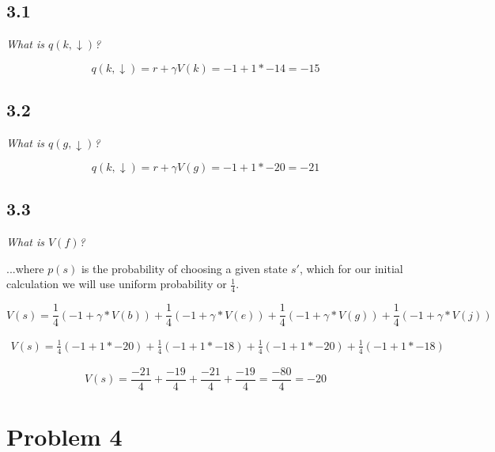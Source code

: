 \documentclass{article}
\begin{document}
\subsection*{3.1}

\textit{What is $q(k, \downarrow)$?}

\begin{equation}
    q(k, \downarrow) = r + \gamma V(k) = -1 + 1 * -14 = -15
\end{equation}



\subsection*{3.2}

\textit{What is $q(g, \downarrow)$?}

\begin{equation}
    q(k, \downarrow) = r + \gamma V(g) = -1 + 1 * -20 = -21
\end{equation}



\subsection*{3.3}

\textit{What is $V(f)$?}

...where $p(s)$ is the probability of choosing a given state $s'$, which for our initial calculation we will use uniform probability or $\frac{1}{4}$.

\begin{equation}
    V(s) = \frac{1}{4}(-1 + \gamma * V(b)) + \frac{1}{4}(-1 + \gamma * V(e)) + \frac{1}{4}(-1 + \gamma * V(g)) + \frac{1}{4}(-1 + \gamma * V(j))
\end{equation}

\begin{eqnarray}
    V(s) = \frac{1}{4}(-1 + 1 * -20) + \frac{1}{4}(-1 + 1 * -18) + \frac{1}{4}(-1 + 1 * -20) + \frac{1}{4}(-1 + 1 * -18)
\end{eqnarray}

\begin{equation}
    V(s) = \frac{-21}{4} + \frac{-19}{4} + \frac{-21}{4} + \frac{-19}{4} = \frac{-80}{4} = -20
\end{equation}


\section*{Problem 4}
\end{document}
